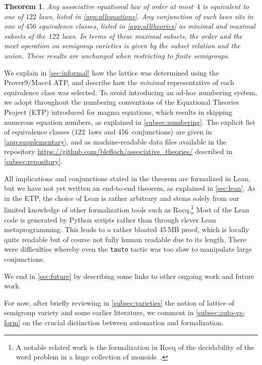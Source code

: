 \documentclass[12pt]{amsart}
\theoremstyle{plain}
\newtheorem{theorem}{Theorem}[section]
\theoremstyle{definition}
\begin{document}
\begin{theorem}
  Any associative equational law of order at most~$4$ is equivalent to one of $122$ laws, listed in \autoref{app:allequations}.
  Any conjunction of such laws sits in one of $456$ equivalence classes, listed in \autoref{app:alltheories} as minimal and maximal subsets of the~$122$ laws.
  In terms of these maximal subsets, the order and the meet operation on semigroup varieties is given by the subset relation and the union.
  These results are unchanged when restricting to finite semigroups.
\end{theorem}

We explain in \autoref{sec:informal} how the lattice was determined using the Prover9/Mace4 ATP\@, and describe how the \emph{minimal} representative of each equivalence class was selected.
To avoid introducing an ad-hoc numbering system, we adopt throughout the numbering conventions of the Equational Theories Project (ETP) introduced for magma equations, which results in skipping numerous equation numbers, as explained in \autoref{subsec:numbering}.
The explicit list of equivalence classes ($122$~laws and $456$~conjunctions) are given in \autoref{app:supplementary}, and as machine-readable data files available in the repository \url{https://github.com/blefloch/associative_theories/} described in \autoref{subsec:repository}.

All implications and conjunctions stated in the theorem are formalized in Lean, but we have not yet written an end-to-end theorem, as explained in \autoref{sec:lean}.
As in the ETP, the choice of Lean is rather arbitrary and stems solely from our limited knowledge of other formalization tools such as Rocq.\!\footnote{A notable related work is the formalization in Rocq of the decidability of the word problem in a huge collection of monoids~\cite{cirpons2026certifying}.}
Most of the Lean code is generated by Python scripts rather than through clever Lean metaprogramming.  This leads to a rather bloated 45\,MB proof, which is locally quite readable but of course not fully human readable due to its length.  There were difficulties whereby even the \texttt{tauto} tactic was too slow to manipulate large conjunctions.

We end in \autoref{sec:future} by describing some links to other ongoing work and future work.

For now, after briefly reviewing in \autoref{subsec:varieties} the notion of lattice of semigroup variety and some earlier literature, we comment in \autoref{subsec:auto-vs-form} on the crucial distinction between automation and formalization.
\end{document}
